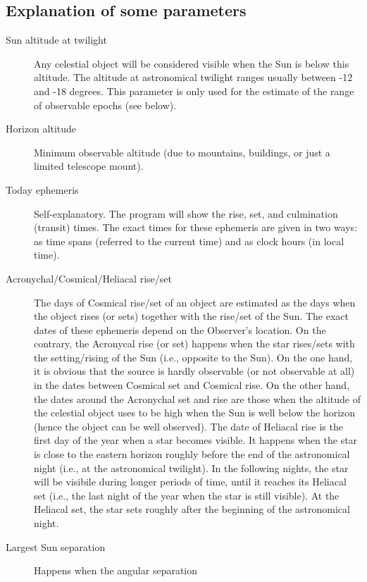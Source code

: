 \subsection*{Explanation of some parameters}

\begin{description}
\item[Sun altitude at twilight] Any celestial object will be
  considered visible when the Sun is below this altitude. The altitude
  at astronomical twilight ranges usually between -12 and -18
  degrees. This parameter is only used for the estimate of the range
  of observable epochs (see below).
\item[Horizon altitude] Minimum observable altitude (due to mountains,
  buildings, or just a limited telescope mount).
\item[Today ephemeris] Self-explanatory. The program will show the
  rise, set, and culmination (transit) times. The exact times for
  these ephemeris are given in two ways: as time spans (referred to
  the current time) and as clock hours (in local time).
\item[Acronychal/Cosmical/Heliacal rise/set] The days of Cosmical
  rise/set of an object are estimated as the days when the object
  rises (or sets) together with the rise/set of the Sun. The exact
  dates of these ephemeris depend on the Observer's location. On the
  contrary, the Acronycal rise (or set) happens when the star
  rises/sets with the setting/rising of the Sun (i.e., opposite to the
  Sun). On the one hand, it is obvious that the source is hardly
  observable (or not observable at all) in the dates between Cosmical
  set and Cosmical rise. On the other hand, the dates around the
  Acronychal set and rise are those when the altitude of the celestial
  object uses to be high when the Sun is well below the horizon (hence
  the object can be well observed). The date of Heliacal rise is the
  first day of the year when a star becomes visible. It happens when
  the star is close to the eastern horizon roughly before the end of
  the astronomical night (i.e., at the astronomical twilight). In the
  following nights, the star will be visibile during longer periods of
  time, until it reaches its Heliacal set (i.e., the last night of the
  year when the star is still visible). At the Heliacal set, the star
  sets roughly after the beginning of the astronomical night.
\item[Largest Sun separation] Happens when the angular separation

\end{description}
